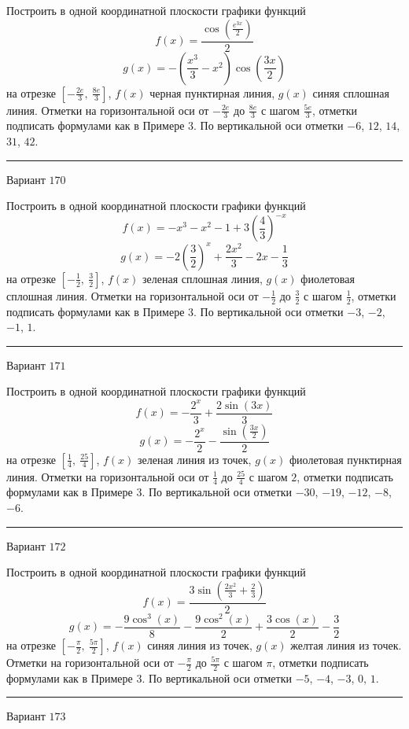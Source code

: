 \documentclass[11pt]{report}
\begin{document}
Построить в одной координатной плоскости графики функций $$f(x) = \frac{\cos{\left(\frac{e^{3 x}}{2} \right)}}{2}$$ $$g(x) = - \left(\frac{x^{3}}{3} - x^{2}\right) \cos{\left(\frac{3 x}{2} \right)}$$ на отрезке $\left[- \frac{2 e}{3}, \  \frac{8 e}{3}\right]$, $f(x)$ черная пунктирная линия, $g(x)$ синяя сплошная линия. Отметки на горизонтальной оси от $- \frac{2 e}{3}$ до $\frac{8 e}{3}$ с шагом $\frac{5 e}{3}$, отметки подписать формулами как в Примере 3. По вертикальной оси отметки $-6$, $12$, $14$, $31$, $42$.
\begin{center}
\noindent\rule{8cm}{0.4pt}
\end{center}
Вариант $170$


Построить в одной координатной плоскости графики функций $$f(x) = - x^{3} - x^{2} - 1 + 3 \left(\frac{4}{3}\right)^{- x}$$ $$g(x) = - 2 \left(\frac{3}{2}\right)^{x} + \frac{2 x^{2}}{3} - 2 x - \frac{1}{3}$$ на отрезке $\left[- \frac{1}{2}, \  \frac{3}{2}\right]$, $f(x)$ зеленая сплошная линия, $g(x)$ фиолетовая сплошная линия. Отметки на горизонтальной оси от $- \frac{1}{2}$ до $\frac{3}{2}$ с шагом $\frac{1}{2}$, отметки подписать формулами как в Примере 3. По вертикальной оси отметки $-3$, $-2$, $-1$, $1$.
\begin{center}
\noindent\rule{8cm}{0.4pt}
\end{center}
Вариант $171$


Построить в одной координатной плоскости графики функций $$f(x) = - \frac{2^{x}}{3} + \frac{2 \sin{\left(3 x \right)}}{3}$$ $$g(x) = - \frac{2^{x}}{2} - \frac{\sin{\left(\frac{3 x}{2} \right)}}{2}$$ на отрезке $\left[\frac{1}{4}, \  \frac{25}{4}\right]$, $f(x)$ зеленая линия из точек, $g(x)$ фиолетовая пунктирная линия. Отметки на горизонтальной оси от $\frac{1}{4}$ до $\frac{25}{4}$ с шагом $2$, отметки подписать формулами как в Примере 3. По вертикальной оси отметки $-30$, $-19$, $-12$, $-8$, $-6$.
\begin{center}
\noindent\rule{8cm}{0.4pt}
\end{center}
Вариант $172$


Построить в одной координатной плоскости графики функций $$f(x) = \frac{3 \sin{\left(\frac{2 x^{2}}{3} + \frac{2}{3} \right)}}{2}$$ $$g(x) = - \frac{9 \cos^{3}{\left(x \right)}}{8} - \frac{9 \cos^{2}{\left(x \right)}}{2} + \frac{3 \cos{\left(x \right)}}{2} - \frac{3}{2}$$ на отрезке $\left[- \frac{\pi}{2}, \  \frac{5 \pi}{2}\right]$, $f(x)$ синяя линия из точек, $g(x)$ желтая линия из точек. Отметки на горизонтальной оси от $- \frac{\pi}{2}$ до $\frac{5 \pi}{2}$ с шагом $\pi$, отметки подписать формулами как в Примере 3. По вертикальной оси отметки $-5$, $-4$, $-3$, $0$, $1$.
\begin{center}
\noindent\rule{8cm}{0.4pt}
\end{center}
Вариант $173$
\end{document}
